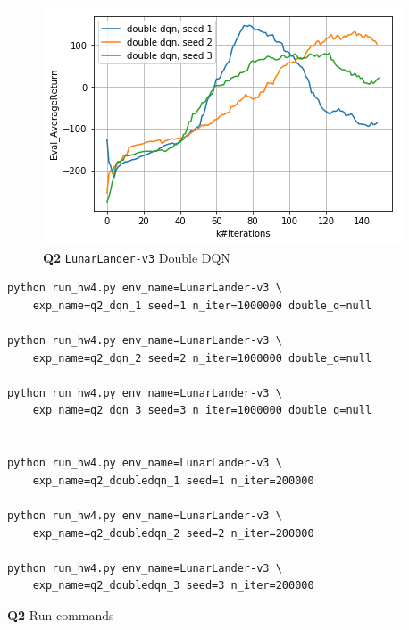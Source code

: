 \documentclass[11pt]{article}
\begin{document}
\begin{figure}[htbp]
\centering
\includegraphics[width=.9\linewidth]{./22.png}
\caption{\textbf{Q2} \texttt{LunarLander-v3} Double DQN}
\end{figure}

\begin{listing}[htbp]
\begin{verbatim}
python run_hw4.py env_name=LunarLander-v3 \
    exp_name=q2_dqn_1 seed=1 n_iter=1000000 double_q=null

python run_hw4.py env_name=LunarLander-v3 \
    exp_name=q2_dqn_2 seed=2 n_iter=1000000 double_q=null

python run_hw4.py env_name=LunarLander-v3 \
    exp_name=q2_dqn_3 seed=3 n_iter=1000000 double_q=null


python run_hw4.py env_name=LunarLander-v3 \
    exp_name=q2_doubledqn_1 seed=1 n_iter=200000

python run_hw4.py env_name=LunarLander-v3 \
    exp_name=q2_doubledqn_2 seed=2 n_iter=200000

python run_hw4.py env_name=LunarLander-v3 \
    exp_name=q2_doubledqn_3 seed=3 n_iter=200000
\end{verbatim}
\caption{\textbf{Q2} Run commands}
\end{listing}

\clearpage
\end{document}

